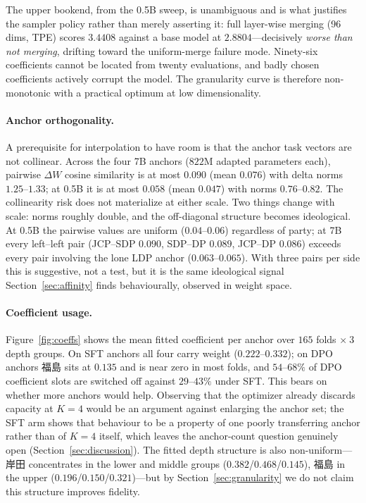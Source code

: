 \documentclass[11pt,letterpaper]{article}
\begin{document}
The upper bookend, from the 0.5B sweep, is unambiguous and is what justifies the sampler policy rather than merely asserting it: full layer-wise merging (96 dims, TPE) scores $3.4408$ against a base model at $2.8804$---decisively \emph{worse than not merging}, drifting toward the uniform-merge failure mode. Ninety-six coefficients cannot be located from twenty evaluations, and badly chosen coefficients actively corrupt the model. The granularity curve is therefore non-monotonic with a practical optimum at low dimensionality.

\paragraph{Anchor orthogonality.} A prerequisite for interpolation to have room is that the anchor task vectors are not collinear. Across the four 7B anchors ($822$M adapted parameters each), pairwise $\Delta W$ cosine similarity is at most $0.090$ (mean $0.076$) with delta norms $1.25$--$1.33$; at 0.5B it is at most $0.058$ (mean $0.047$) with norms $0.76$--$0.82$. The collinearity risk does not materialize at either scale. Two things change with scale: norms roughly double, and the off-diagonal structure becomes ideological. At 0.5B the pairwise values are uniform ($0.04$--$0.06$) regardless of party; at 7B every left--left pair (JCP--SDP $0.090$, SDP--DP $0.089$, JCP--DP $0.086$) exceeds every pair involving the lone LDP anchor ($0.063$--$0.065$). With three pairs per side this is suggestive, not a test, but it is the same ideological signal Section~\ref{sec:affinity} finds behaviourally, observed in weight space.

\paragraph{Coefficient usage.} Figure~\ref{fig:coeffs} shows the mean fitted coefficient per anchor over $165$ folds $\times\ 3$ depth groups. On SFT anchors all four carry weight ($0.222$--$0.332$); on DPO anchors 福島 sits at $0.135$ and is near zero in most folds, and $54$--$68\%$ of DPO coefficient slots are switched off against $29$--$43\%$ under SFT. This bears on whether more anchors would help. Observing that the optimizer already discards capacity at $K=4$ would be an argument against enlarging the anchor set; the SFT arm shows that behaviour to be a property of one poorly transferring anchor rather than of $K=4$ itself, which leaves the anchor-count question genuinely open (Section~\ref{sec:discussion}). The fitted depth structure is also non-uniform---岸田 concentrates in the lower and middle groups ($0.382$/$0.468$/$0.145$), 福島 in the upper ($0.196$/$0.150$/$0.321$)---but by Section~\ref{sec:granularity} we do not claim this structure improves fidelity.
\end{document}
